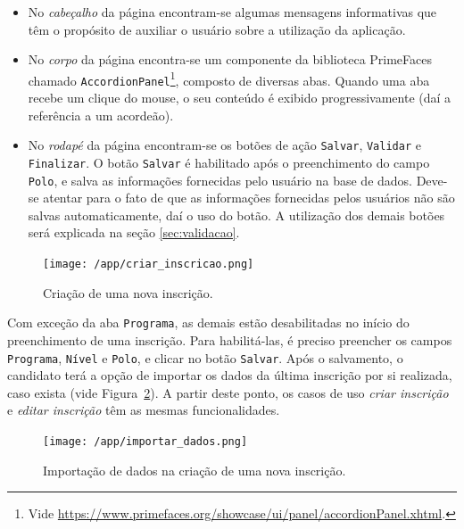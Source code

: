 \documentclass[
  10.5pt,				  %
	openright,			%
	twoside,			  %
  a5paper,
  chapter=TITLE,	%
	section=TITLE,	%
  hyphens,        %
	english,        %
	brazil          %
]{abntex2}
\begin{document}
\begin{itemize}
  \item No \emph{cabeçalho} da página encontram-se algumas mensagens informativas que têm o propósito de auxiliar o usuário sobre a utilização da aplicação.
  \item No \emph{corpo} da página encontra-se um componente da biblioteca PrimeFaces chamado \texttt{AccordionPanel}\footnote{Vide \href{https://www.primefaces.org/showcase/ui/panel/accordionPanel.xhtml}{https://www.primefaces.org/showcase/ui/panel/accordionPanel.xhtml}.}, composto de diversas abas. Quando uma aba recebe um clique do mouse, o seu conteúdo é exibido progressivamente (daí a referência a um acordeão).
  \item No \emph{rodapé} da página encontram-se os botões de ação \texttt{Salvar}, \texttt{Validar} e \texttt{Finalizar}. O botão \texttt{Salvar} é habilitado após o preenchimento do campo \texttt{Polo}, e salva as informações fornecidas pelo usuário na base de dados. Deve-se atentar para o fato de que as informações fornecidas pelos usuários não são salvas automaticamente, daí o uso do botão. A utilização dos demais botões será explicada na seção \ref{sec:validacao}.
\end{itemize}


\begin{figure}[!ht]
  \caption{\label{fig:criar_inscricao} Criação de uma nova inscrição.}
  \begin{center}
    \texttt{[image: /app/criar\_inscricao.png]}
  \end{center}
\end{figure}

Com exceção da aba \texttt{Programa}, as demais estão desabilitadas no início do preenchimento de uma inscrição. Para habilitá-las, é preciso preencher os campos \texttt{Programa}, \texttt{Nível} e \texttt{Polo}, e clicar no botão \texttt{Salvar}. Após o salvamento, o candidato terá a opção de importar os dados da última inscrição por si realizada, caso exista (vide Figura~\ref{fig:importar_dados}). A partir deste ponto, os casos de uso \emph{criar inscrição} e \emph{editar inscrição} têm as mesmas funcionalidades.


\begin{figure}[!ht]
  \caption{\label{fig:importar_dados} Importação de dados na criação de uma nova inscrição.}
  \begin{center}
    \texttt{[image: /app/importar\_dados.png]}
  \end{center}
\end{figure}
\end{document}
